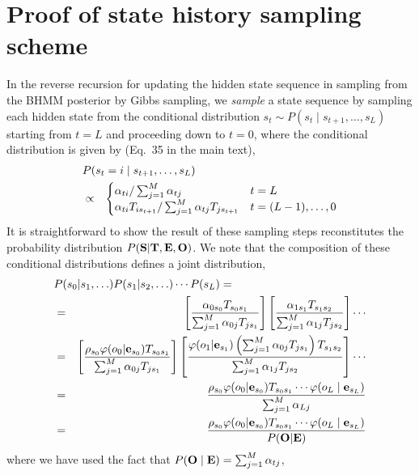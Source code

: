 \documentclass[endfloats,prl,twocolumn,superscriptaddress,nofootinbib,longbibliography]{revtex4-1}
\newcommand{\bfm}[1]{{\bf #1}}
\begin{document}
\section{Proof of state history sampling scheme}
\label{section:proof-state-history-sampling}

In the reverse recursion for updating the hidden state sequence in sampling from the BHMM posterior by Gibbs sampling, we \emph{sample} a state sequence by sampling each hidden state from the conditional distribution $s_t \sim P(s_t \mid s_{t+1}, \ldots, s_L)$ starting from $t = L$ and proceeding down to $t = 0$, where the conditional distribution is given by (Eq.~35 in the main text),
\begin{eqnarray}
\lefteqn{P(s_t = i \mid s_{t+1}, \ldots, s_L)} \\
&\propto& \begin{cases}
\alpha_{t i} / \sum_{j=1}^M \alpha_{t j} & t = L \\
\alpha_{t i} T_{i s_{t+1}} / \sum_{j=1}^M \alpha_{t j} T_{j s_{t+1}} & t = (L-1),\ldots,0
\end{cases} \nonumber
\end{eqnarray} 
It is straightforward to show the result of these sampling steps reconstitutes the probability distribution $P(\bfm{S} | \bfm{T}, \bfm{E}, \bfm{O})$.
We note that the composition of these conditional distributions defines a joint distribution,
\begin{eqnarray}
\lefteqn{P(s_0 | s_1,\ldots) P(s_1 | s_2, \ldots) \cdots P(s_L) =} \nonumber \\
&=& \left[\frac{\alpha_{0 s_0} T_{s_0 s_1}}{\sum_{j=1}^M \alpha_{0 j} T_{j s_1}} \right] \left[\frac{\alpha_{1 s_1} T_{s_1 s_2}}{\sum_{j=1}^M \alpha_{1 j} T_{j s_2}} \right] \cdots \nonumber \\
&=& \left[\frac{\rho_{s_0} \varphi(o_0 | \bfm{e}_{s_0}) T_{s_0 s_1}}{\sum_{j=1}^M \alpha_{0 j} T_{j s_1}} \right] \left[\frac{\varphi(o_1 | \bfm{e}_{s_1}) \left(\sum_{j=1}^M \alpha_{0j} T_{j s_1} \right) T_{s_1 s_2}}{\sum_{j=1}^M \alpha_{1 j} T_{j s_2}} \right] \cdots \nonumber \\
&=& \frac{\rho_{s_0} \varphi(o_0 | \bfm{e}_{s_0}) T_{s_0 s_1} \cdots \varphi(o_L \mid \bfm{e}_{s_L})}{\sum_{j=1}^M \alpha_{L j}} \nonumber \\
&=& \frac{\rho_{s_0} \varphi(o_0 | \bfm{e}_{s_0}) T_{s_0 s_1} \cdots \varphi(o_L \mid \bfm{e}_{s_L})}{P(\bfm{O} | \bfm{E}) }
\end{eqnarray}
where we have used the fact that $P(\bfm{O} \mid \bfm{E}) = \sum_{j=1}^M \alpha_{tj}$,
\end{document}
